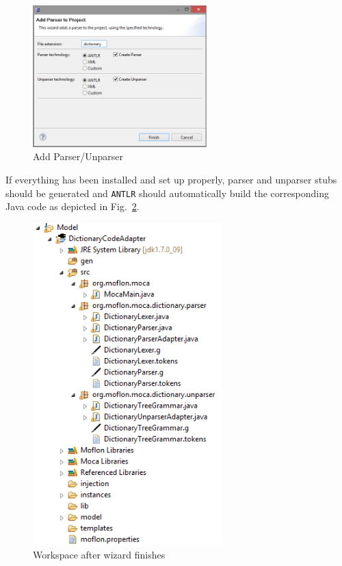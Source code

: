 \begin{enumerate}
\begin{figure}[!htbp]
\begin{center}
 \includegraphics[width=0.6\textwidth]{pics/moca/2TextToMocaTree/2-AddParser}
  \caption{Add Parser/Unparser}
  \label{fig:moca-2-AddParser}
\end{center}
\end{figure}

\end{enumerate}

If everything has been installed and set up properly, parser and unparser stubs should be generated and \texttt{ANTLR} should automatically build the corresponding Java code as depicted in Fig.~\ref{fig:moca-3-WizardResult}. 

\begin{figure}[!htbp]
\begin{center}
 \includegraphics[width=0.65\textwidth]{pics/moca/2TextToMocaTree/3-WizardResult}
  \caption{Workspace after wizard finishes}
  \label{fig:moca-3-WizardResult}
\end{center}
\end{figure}
